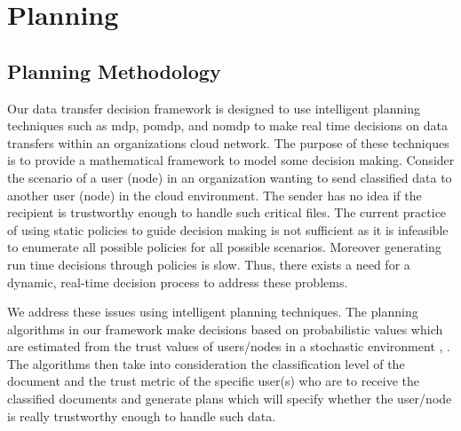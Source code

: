 \section{Planning}
\subsection{Planning Methodology}
Our data transfer decision framework is designed to use intelligent planning
techniques such as \gls{mdp}, \gls{pomdp}, and \gls{nomdp} to
make real time decisions on data transfers within an organizations cloud
network. The purpose of these techniques is to provide a mathematical framework
to model some decision making. Consider the scenario of a user (node) in an
organization wanting to send classified data to another user (node) in the cloud
environment. The sender has no idea if the recipient is trustworthy enough to
handle such critical files. The current practice of using static policies to
guide decision making is not sufficient as it is infeasible to enumerate all
possible policies for all possible scenarios. Moreover generating run time
decisions through policies is slow. Thus, there exists a need for a dynamic,
real-time decision process to address these problems. 

We address these issues using intelligent planning techniques. The planning
algorithms in our framework make decisions based on probabilistic values which
are estimated from the trust values of users/nodes in a stochastic environment
\autocite{JMarecki2012}, \autocite{JWu.2011}. The algorithms then take into consideration the classification level
of the document and the trust metric of the specific user(s) who are to receive
the classified documents and generate plans which will specify whether the
user/node is really trustworthy enough to handle such data.  

